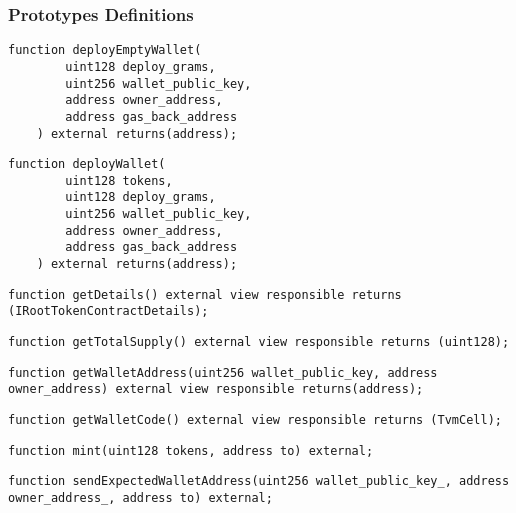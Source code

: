 \subsubsection{Prototypes Definitions}

\vspace{2cm}

\begin{lstlisting}[firstnumber=30]
    function deployEmptyWallet(
        uint128 deploy_grams,
        uint256 wallet_public_key,
        address owner_address,
        address gas_back_address
    ) external returns(address);
\end{lstlisting}
\vspace{2cm}

\begin{lstlisting}[firstnumber=22]
    function deployWallet(
        uint128 tokens,
        uint128 deploy_grams,
        uint256 wallet_public_key,
        address owner_address,
        address gas_back_address
    ) external returns(address);
\end{lstlisting}
\vspace{2cm}

\begin{lstlisting}[firstnumber=14]
    function getDetails() external view responsible returns (IRootTokenContractDetails);
\end{lstlisting}
\vspace{2cm}

\begin{lstlisting}[firstnumber=16]
    function getTotalSupply() external view responsible returns (uint128);
\end{lstlisting}
\vspace{2cm}

\begin{lstlisting}[firstnumber=20]
    function getWalletAddress(uint256 wallet_public_key, address owner_address) external view responsible returns(address);
\end{lstlisting}
\vspace{2cm}

\begin{lstlisting}[firstnumber=18]
    function getWalletCode() external view responsible returns (TvmCell);
\end{lstlisting}
\vspace{2cm}

\begin{lstlisting}[firstnumber=37]
    function mint(uint128 tokens, address to) external;
\end{lstlisting}
\vspace{2cm}

\begin{lstlisting}[firstnumber=39]
    function sendExpectedWalletAddress(uint256 wallet_public_key_, address owner_address_, address to) external;
\end{lstlisting}
